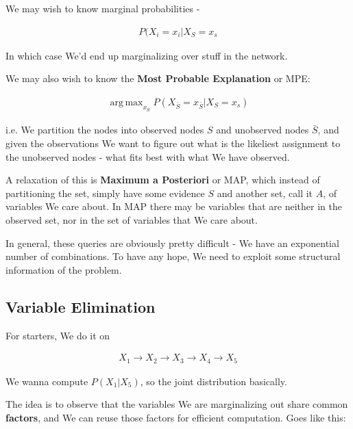 \documentclass{article}
\DeclareMathOperator*{\argmax}{arg\,max}
\begin{document}
		We may wish to know marginal probabilities - 
		
		\begin{align}
			P(X_i=x_i|X_S=x_s
		\end{align}
		
		In which case We'd end up marginalizing over stuff in the network.
		
		We may also wish to know the \textbf{Most Probable Explanation} or MPE:
		
		\begin{align}
			\argmax_{x_{\bar{S}}}P(X_{\bar{S}} = x_{\bar{S}} | X_S = x_s)	
		\end{align}	
		
		i.e. We partition the nodes into observed nodes $S$ and unobserved nodes $\bar{S}$, and given the observations We want to figure out what is the likeliest assignment to the unobserved nodes  - what fits best with what We have observed.
		
		A relaxation of this is \textbf{Maximum a Posteriori} or MAP, which instead of partitioning the set, simply have some evidence $S$ and another set, call it $A$, of variables We care about. In MAP there may be variables that are neither in the observed set, nor in the set of variables that We care about.
		
		In general, these queries are obviously pretty difficult - We have an exponential number of combinations. To have any hope, We need to exploit some structural information of the problem.
		
	\subsection{Variable Elimination}
	
		For starters, We do it on
		
		\begin{align}
			X_1\to X_2\to X_3\to X_4\to X_5
		\end{align} 
		
		We wanna compute $P(X_1 | X_5)$, so the joint distribution basically. 
		
		The idea is to observe that the variables We are marginalizing out share common \textbf{factors}, and We can reuse those factors for efficient computation. Goes like this:
		
\end{document}
